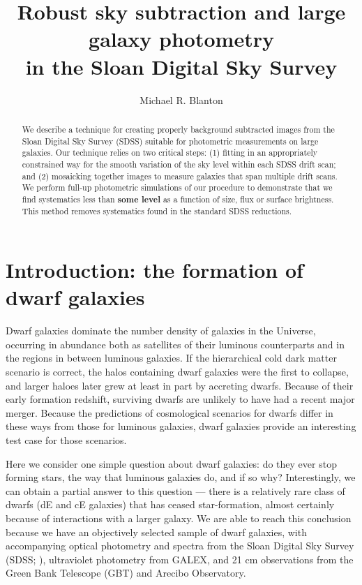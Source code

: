 \documentclass[10pt,preprint]{aastex}
\newcounter{address}
\begin{document}
\title{ Robust sky subtraction and large galaxy photometry \\
in the Sloan Digital Sky Survey}

\author{
Michael R. Blanton\altaffilmark{\ref{NYU}}}

\setcounter{address}{1}

\begin{abstract}
We describe a technique for creating properly background subtracted
images from the Sloan Digital Sky Survey (SDSS) suitable for
photometric measurements on large galaxies. Our technique relies on
two critical steps: (1) fitting in an appropriately constrained way
for the smooth variation of the sky level within each SDSS drift scan;
and (2) mosaicking together images to measure galaxies that span
multiple drift scans. We perform full-up photometric simulations of
our procedure to demonstrate that we find systematics less than {\bf
some level} as a function of size, flux or surface brightness. This
method removes systematics found in the standard SDSS reductions.
\end{abstract}

\section{ Introduction: the formation of dwarf galaxies}
\label{intro}

Dwarf galaxies dominate the number density of galaxies in the
Universe, occurring in abundance both as satellites of their luminous
counterparts and in the regions in between luminous galaxies.  If the
hierarchical cold dark matter scenario is correct, the halos
containing dwarf galaxies were the first to collapse, and larger
haloes later grew at least in part by accreting dwarfs.  Because of
their early formation redshift, surviving dwarfs are unlikely to have
had a recent major merger.  Because the predictions of cosmological
scenarios for dwarfs differ in these ways from those for luminous
galaxies, dwarf galaxies provide an interesting test case for those
scenarios.

Here we consider one simple question about dwarf galaxies: do they
ever stop forming stars, the way that luminous galaxies do, and if so
why? Interestingly, we can obtain a partial answer to this question
--- there is a relatively rare class of dwarfs (dE and cE galaxies)
that has ceased star-formation, almost certainly because of
interactions with a larger galaxy. We are able to reach this
conclusion because we have an objectively selected sample of dwarf
galaxies, with accompanying optical photometry and spectra from the
Sloan Digital Sky Survey (SDSS; \citealt{york00a}), ultraviolet
photometry from GALEX, and 21 cm observations from the Green Bank
Telescope (GBT) and Arecibo Observatory.
\end{document}
